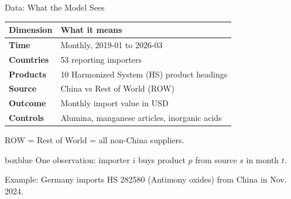\documentclass[aspectratio=169,11pt]{beamer}
\newcommand{\plainbox}[2]{%
  \begin{beamercolorbox}[rounded=true,sep=0.75em,wd=\textwidth]{#1}
    #2
  \end{beamercolorbox}
}
\begin{document}
\begin{frame}{Data: What the Model Sees}
  \small
  \begin{tabularx}{\textwidth}{>{\bfseries}p{}X}
    \toprule
    Dimension & What it means \\
    \midrule
    Time & Monthly, 2019-01 to 2026-03 \\
    Countries & 53 reporting importers \\
    Products & 10 Harmonized System (HS) product headings \\
    Source & China vs Rest of World (ROW) \\
    Outcome & Monthly import value in USD \\
    Controls & Alumina, manganese articles, inorganic acids \\
    \bottomrule
  \end{tabularx}

  \vspace{0.18cm}
  \small ROW = Rest of World = all non-China suppliers.

  \vspace{0.22cm}
  \plainbox{boxblue}{%
    \normalsize One observation: importer \(i\) buys product \(p\) from source \(s\) in month \(t\).

    \vspace{0.12cm}
    \small Example: Germany imports HS 282580 (Antimony oxides) from China in Nov. 2024.
  }
\end{frame}
\end{document}
